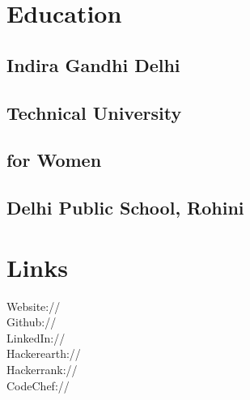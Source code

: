 \documentclass[]{deedy-resume-openfont}
\begin{document}
\begin{minipage}[t]{0.33\textwidth} 


\section{Education} 

\subsection{Indira Gandhi Delhi}\subsection{Technical University}\subsection{ for Women}
\sectionsep


\subsection{Delhi Public School, Rohini}
\sectionsep


\section{Links}
Website:// \href{https://tanvi-surana.github.io}{} \\
Github:// \href{https://github.com/tanvi-surana}{} \\
LinkedIn://  \href{https://www.linkedin.com/in/tanvisurana}{} \\
Hackerearth://  \href{https://www.hackerearth.com/@tanvi.surana}{} \\
Hackerrank://  \href{https://www.hackerrank.com/tanvisurana20}{} \\
CodeChef://  \href{https://www.codechef.com/users/skull2012}{} \\
\sectionsep


\end{minipage}
\end{document}
